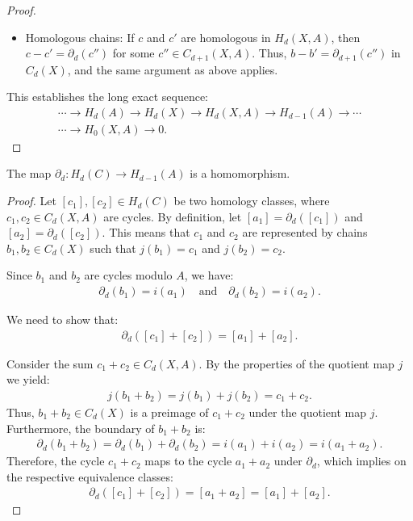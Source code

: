 \begin{proof}
\begin{itemize}
		\item Homologous chains: If \(c\) and \(c'\) are homologous in \(H_{d}(X, A)\), then \(c - c' = \partial_{d}(c'')\) for some \(c'' \in C_{d+1}(X, A)\). Thus, \(b - b' = \partial_{d+1}(c'')\) in \(C_{d}(X)\), and the same argument as above applies.
	\end{itemize}
			
	This establishes the long exact sequence:
	\begin{align}
		\cdots \rightarrow H_{d}(A) \rightarrow H_{d}(X) \rightarrow H_{d}(X, A) \rightarrow H_{d-1}(A) \rightarrow \cdots \\
		\cdots \rightarrow H_{0}(X, A) \rightarrow 0.                                                                      
	\end{align}
\end{proof}

\begin{proposition}
	The map \(\partial_{d}: H_{d}(C) \rightarrow H_{d-1}(A)\) is a homomorphism.
\end{proposition}

\begin{proof}
	Let \([c_{1}], [c_{2}] \in H_{d}(C)\) be two homology classes, where \(c_{1}, c_{2} \in C_{d}(X, A)\) are cycles. By definition, let \([a_{1}] = \partial_{d}([c_{1}])\) and \([a_{2}] = \partial_{d}([c_{2}])\). This means that \(c_{1}\) and \(c_{2}\) are represented by chains \(b_{1}, b_{2} \in C_{d}(X)\) such that \(j(b_{1}) = c_{1}\) and \(j(b_{2}) = c_{2}\).
			
	Since \(b_{1}\) and \(b_{2}\) are cycles modulo \(A\), we have:
	\begin{align}
		\partial_{d}(b_{1}) = i(a_{1}) \quad \text{and} \quad \partial_{d}(b_{2}) = i(a_{2}). 
	\end{align}
			
	We need to show that:
	\begin{align}
		\partial_{d}([c_{1}] + [c_{2}]) = [a_{1}] + [a_{2}]. 
	\end{align}
			
	Consider the sum \(c_{1} + c_{2} \in C_{d}(X, A)\). By the properties of the quotient map \(j\) we yield:
	\begin{align}
		j(b_{1} + b_{2}) = j(b_{1}) + j(b_{2}) = c_{1} + c_{2}. 
	\end{align}
	Thus, \(b_{1} + b_{2} \in C_{d}(X)\) is a preimage of \(c_{1} + c_{2}\) under the quotient map \(j\). Furthermore, the boundary of \(b_{1} + b_{2}\) is:
	\begin{align}
		\partial_{d}(b_{1} + b_{2}) = \partial_{d}(b_{1}) + \partial_{d}(b_{2}) = i(a_{1}) + i(a_{2}) = i(a_{1} + a_{2}). 
	\end{align}
	Therefore, the cycle \(c_{1} + c_{2}\) maps to the cycle \(a_{1} + a_{2}\) under \(\partial_{d}\), which implies on the respective equivalence classes:
	\begin{align}
		\partial_{d}([c_{1}] + [c_{2}]) = [a_{1} + a_{2}] = [a_{1}] + [a_{2}]. 
	\end{align}
\end{proof}

